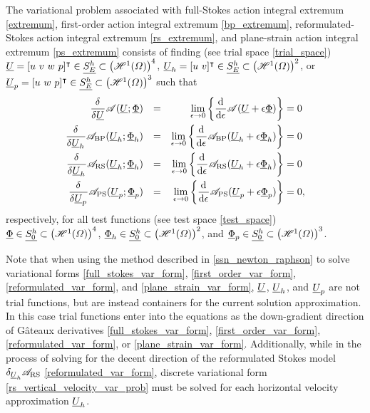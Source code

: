 The variational problem associated with full-Stokes action integral extremum \cref{extremum}, first-order action integral extremum \cref{bp_extremum}, reformulated-Stokes action integral extremum \cref{rs_extremum}, and plane-strain action integral extremum \cref{ps_extremum} consists of finding (see trial space \cref{trial_space}) $\underline{U} = [u\ v\ w\ p]^\intercal \in \underline{S_E^h} \subset \left( \mathscr{H}^1(\varOmega) \right)^4$, $\underline{U}_h = [u\ v]^\intercal \in \underline{S_E^h} \subset \left( \mathscr{H}^1(\varOmega) \right)^2$, or $\underline{U}_p = [u\ w\ p]^\intercal \in \underline{S_E^h} \subset \left( \mathscr{H}^1(\varOmega) \right)^3$ such that
{\small
\begin{align}
  \label{full_stokes_var_form}
  \frac{\delta{^{}} }{\delta \underline{U}{^{}} } \mathscr{A}(\underline{U}; \underline{\Phi}) &&= && \lim_{\epsilon \rightarrow 0} \left\{ \frac{\mathrm{d}{^{}} }{\mathrm{d} \epsilon{^{}} } \mathscr{A}(\underline{U} + \epsilon \underline{\Phi}) \right\} &= 0 \\
  \label{first_order_var_form}
  \frac{\delta{^{}} }{\delta \underline{U}_h{^{}} } \mathscr{A}_{\text{BP}}(\underline{U}_h; \underline{\Phi}_h) &&= && \lim_{\epsilon \rightarrow 0} \left\{ \frac{\mathrm{d}{^{}} }{\mathrm{d} \epsilon{^{}} } \mathscr{A}_{\text{BP}}(\underline{U}_h + \epsilon \underline{\Phi}_h) \right\} &= 0 \\
  \label{reformulated_var_form}
  \frac{\delta{^{}} }{\delta \underline{U}_h{^{}} } \mathscr{A}_{\text{RS}} (\underline{U}_h; \underline{\Phi}_h) &&= && \lim_{\epsilon \rightarrow 0} \left\{ \frac{\mathrm{d}{^{}} }{\mathrm{d} \epsilon{^{}} } \mathscr{A}_{\text{RS}}(\underline{U}_h + \epsilon \underline{\Phi}_h) \right\} &= 0 \\
  \label{plane_strain_var_form}
  \frac{\delta{^{}} }{\delta \underline{U}_p{^{}} } \mathscr{A}_{\text{PS}}(\underline{U}_p; \underline{\Phi}_p) &&= && \lim_{\epsilon \rightarrow 0} \left\{ \frac{\mathrm{d}{^{}} }{\mathrm{d} \epsilon{^{}} } \mathscr{A}_{\text{PS}}(\underline{U}_p + \epsilon \underline{\Phi}_p) \right\} &= 0,
\end{align}}
respectively, for all test functions (see test space \cref{test_space}) $\underline{\Phi} \in \underline{S_0^h} \subset \left( \mathscr{H}^1(\varOmega) \right)^4$, $\underline{\Phi}_h \in \underline{S_0^h} \subset \left( \mathscr{H}^1(\varOmega) \right)^2$, and $\underline{\Phi}_p \in \underline{S_0^h} \subset \left( \mathscr{H}^1(\varOmega) \right)^3$.

Note that when using the method described in \cref{ssn_newton_raphson} to solve variational forms \cref{full_stokes_var_form}, \cref{first_order_var_form}, \cref{reformulated_var_form}, and \cref{plane_strain_var_form}, $\underline{U}$, $\underline{U}_h$, and $\underline{U}_p$ are not trial functions, but are instead containers for the current solution approximation.  In this case trial functions enter into the equations as the down-gradient direction of G\^{a}teaux derivatives \cref{full_stokes_var_form}, \cref{first_order_var_form}, \cref{reformulated_var_form}, or \cref{plane_strain_var_form}.  Additionally, while in the process of solving for the decent direction of the reformulated Stokes model $\delta_{\underline{U}_h} \mathscr{A}_{\text{RS}}$ \cref{reformulated_var_form}, discrete variational form \cref{rs_vertical_velocity_var_prob} must be solved for each horizontal velocity approximation $\underline{U}_h$.



